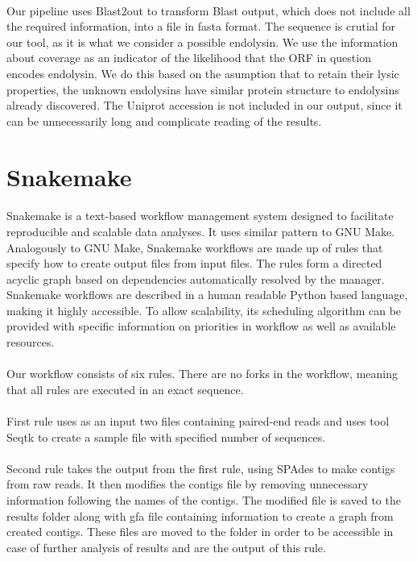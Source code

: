 \paragraph*{}
Our pipeline uses Blast2out to transform Blast output, which does not include all the required information, into a file in fasta format. The sequence is crutial for our tool, as it is what we consider a possible endolysin. We use the information about coverage as an indicator of the likelihood that the ORF in question encodes endolysin. We do this based on the asumption that to retain their lysic properties, the unknown endolysins have similar protein structure to endolysins already discovered. The Uniprot accession is not included in our output, since it can be unnecessarily long and complicate reading of the results.

\section{Snakemake}
\paragraph*{}
Snakemake is a text-based workflow management system designed to facilitate reproducible and scalable data analyses. It uses similar pattern to GNU Make. Analogously to GNU Make, Snakemake workflows are made up of rules that specify how to create output files from input files. The rules form a directed acyclic graph based on dependencies automatically resolved by the manager. Snakemake workflows are described in a human readable Python based language, making it highly accessible. To allow scalability, its scheduling algorithm can be provided with specific information on priorities in workflow as well as available resources.
\paragraph*{}
Our workflow consists of six rules. There are no forks in the workflow, meaning that all rules are executed in an exact sequence.
\paragraph*{}
First rule uses as an input two files containing paired-end reads and uses tool Seqtk to create a sample file with specified number of sequences.
\paragraph*{}
Second rule takes the output from the first rule, using SPAdes to make contigs from raw reads. It then modifies the contigs file by removing unnecessary information following the names of the contigs. The modified file is saved to the results folder along with gfa file containing information to create a graph from created contigs. These files are moved to the folder in order to be accessible in case of further analysis of results and are the output of this rule.
